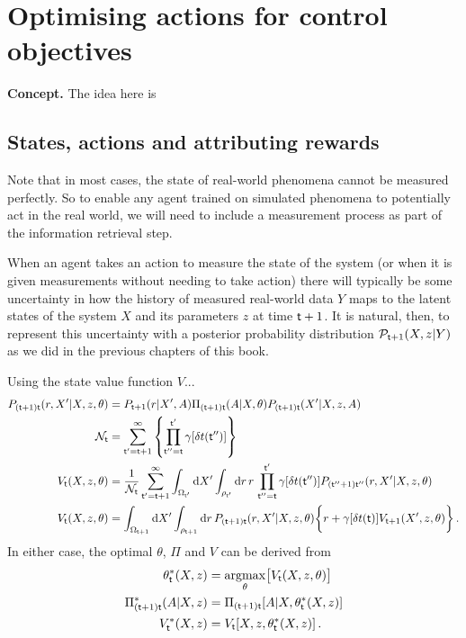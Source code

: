 \chapter{\sffamily Optimising actions for control objectives}

{\bfseries\sffamily Concept.} The idea here is 

\section{\sffamily States, actions and attributing rewards}    

Note that in most cases, the state of real-world phenomena cannot be measured perfectly. So to enable any agent trained on simulated phenomena to potentially act in the real world, we will need to include a measurement process as part of the information retrieval step. 

When an agent takes an action to measure the state of the system (or when it is given measurements without needing to take action) there will typically be some uncertainty in how the history of measured real-world data $Y$ maps to the latent states of the system $X$ and its parameters $z$ at time ${\sf t}+1$. It is natural, then, to represent this uncertainty with a posterior probability distribution ${\cal P}_{{\sf t}+1}(X,z\vert Y)$ as we did in the previous chapters of this book.

Using the state value function $V$...
\begin{align}
P_{({\sf t}+1){\sf t}}(r,X'\vert X, z,\theta) &= P_{{\sf t}+1}(r\vert X',A)\Pi_{({\sf t}+1){\sf t}}(A\vert X,\theta)P_{({\sf t}+1){\sf t}}(X'\vert X,z,A)  \\
{\cal N}_{{\sf t}} &= \sum_{{\sf t}'={\sf t}+1}^{\infty}\left\{ \prod_{{\sf t}''={\sf t}}^{{\sf t}'} \gamma [\delta t({\sf t}'')] \right\} \\
V_{{\sf t}}(X,z,\theta) &= \frac{1}{{\cal N}_{{\sf t}}}\sum_{{\sf t}'={\sf t}+1}^{\infty} \int_{\Omega_{{\sf t}'}}{\rm d}X'\int_{\rho_{{\sf t}'}} {\rm d}r \,r\, \prod_{{\sf t}''={\sf t}}^{{\sf t}'} \gamma [\delta t({\sf t}'')]P_{({\sf t}''+1){\sf t}''}(r,X'\vert X, z,\theta) \\
V_{{\sf t}}(X,z,\theta) &= \int_{\Omega_{{\sf t}+1}}{\rm d}X'\int_{\rho_{{\sf t}+1}} {\rm d}r \, P_{({\sf t}+1){\sf t}}(r,X'\vert X, z,\theta)\bigg\{ r+\gamma [\delta t({\sf t})]V_{{\sf t}+1}(X',z,\theta)\bigg\} \,.
\end{align}
In either case, the optimal $\theta$, $\Pi$ and $V$ can be derived from
\begin{align}
\theta^*_{{\sf t}}(X,z) &= \underset{\theta}{{\rm argmax}} \big[ V_{{\sf t}}(X,z,\theta)\big] \\
\Pi^*_{({\sf t}+1){\sf t}}(A\vert X,z) &= \Pi_{({\sf t}+1){\sf t}}[A\vert X,\theta^*_{{\sf t}}(X,z)] \\
V^*_{{\sf t}}(X,z) &= V_{{\sf t}}[X,z,\theta^*_{{\sf t}}(X,z)] \,.
\end{align}


